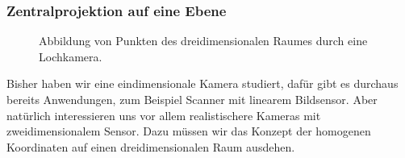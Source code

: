 \subsubsection{Zentralprojektion auf eine Ebene}
\begin{figure}
\centering
\caption{Abbildung von Punkten des dreidimensionalen Raumes durch eine
Lochkamera.
\label{skript:kamera:lochkamera}}
\end{figure}
Bisher haben wir eine eindimensionale Kamera studiert, dafür gibt
es durchaus bereits Anwendungen, zum Beispiel Scanner mit linearem
Bildsensor.
Aber natürlich
interessieren uns vor allem realistischere Kameras mit zweidimensionalem
Sensor.
Dazu müssen wir das Konzept der homogenen Koordinaten auf einen
dreidimensionalen Raum ausdehen.




